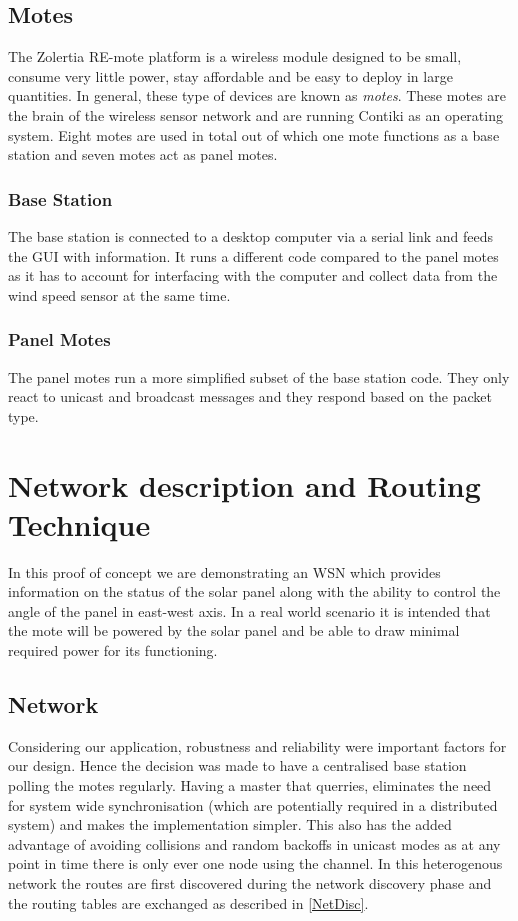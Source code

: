 \documentclass[conference]{IEEEtran}
\begin{document}
\subsection{Motes}
The Zolertia RE-mote platform\cite{REmote} is a wireless module designed to be small, consume very little power, stay affordable and be easy to deploy in large quantities. In general, these type of devices are known as \textit{motes}. These motes are the brain of the wireless sensor network and are running Contiki as an operating system. Eight motes are used in total out of which one mote functions as a base station and seven motes act as panel motes.

\subsubsection{Base Station}
    The base station is connected to a desktop computer via a serial link and feeds the GUI with information. It runs a different code compared to the panel motes as it has to account for interfacing with the computer and collect data from the wind speed sensor at the same time.
\subsubsection{Panel Motes}
    The panel motes run a more simplified subset of the base station code. They only react to unicast and broadcast messages and they respond based on the packet type.

\section{Network description and Routing Technique}
In this proof of concept we are demonstrating an WSN which provides information on the status of the solar panel along with the ability to control the angle of the panel in east-west axis. In a real world scenario it is intended that the mote will be powered by the solar panel and be able to draw minimal required power for its functioning.
\subsection{Network}
Considering our application, robustness and reliability were important factors for our design. Hence the decision was made to have a centralised base station polling the motes regularly. Having a master that querries, eliminates the need for system wide synchronisation (which are potentially required in a distributed system) and makes the implementation simpler. This also has the added advantage of avoiding collisions and random backoffs in unicast modes as at any point in time there is only ever one node using the channel. In this heterogenous network the routes are first discovered during the network discovery phase and the routing tables are exchanged as described in \ref{NetDisc}.
\end{document}
